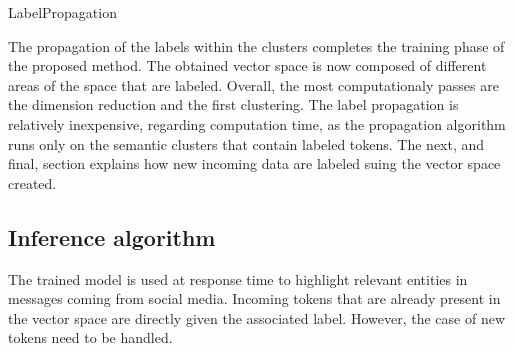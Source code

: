 \begin{algorithm}[htb]
    \DontPrintSemicolon
    \caption{LabelPropagation\label{alg:LP}}
\end{algorithm}

The propagation of the labels within the clusters completes the training phase of the proposed method.
The obtained vector space is now composed of different areas of the space that are labeled.
Overall, the most computationaly passes are the dimension reduction and the first clustering.
The label propagation is relatively inexpensive, regarding computation time, as the propagation
algorithm runs only on the semantic clusters that contain labeled tokens.
The next, and final, section explains how new incoming data are labeled suing the vector
space created.

\subsection{Inference algorithm}
The trained model is used at response time to highlight relevant entities in messages
coming from social media.
Incoming tokens that are already present in the vector space are directly given the associated label.
However, the case of new tokens need to be handled.

